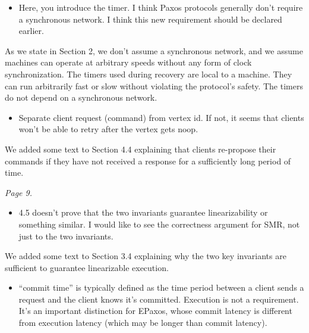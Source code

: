 \documentclass[letterpaper,twocolumn,10pt]{article}
\newenvironment{reviewerquote}
{\list{}{\leftmargin=\parindent\rightmargin=0in}\item[] \itshape \color{ReviewerDarkGray}}%
{\endlist}
\begin{document}
\begin{reviewerquote}
  \begin{itemize}
    \item
      Here, you introduce the timer. I think Paxos protocols generally don't
      require a synchronous network. I think this new requirement should be
      declared earlier.
  \end{itemize}
\end{reviewerquote}

As we state in Section 2, we don't assume a synchronous network, and we assume
machines can operate at arbitrary speeds without any form of clock
synchronization. The timers used during recovery are local to a machine. They
can run arbitrarily fast or slow without violating the protocol's safety. The
timers do not depend on a synchronous network.

\begin{reviewerquote}
  \begin{itemize}
    \item
      Separate client request (command) from vertex id. If not, it seems that
      clients won't be able to retry after the vertex gets noop.
  \end{itemize}
\end{reviewerquote}

We added some text to Section 4.4 explaining that clients re-propose their
commands if they have not received a response for a sufficiently long period of
time.

\begin{reviewerquote}
  Page 9.

  \begin{itemize}
    \item
      4.5 doesn't prove that the two invariants guarantee linearizability or
      something similar. I would like to see the correctness argument for SMR,
      not just to the two invariants.
  \end{itemize}
\end{reviewerquote}

We added some text to Section 3.4 explaining why the two key invariants are
sufficient to guarantee linearizable execution.

\begin{reviewerquote}
  \begin{itemize}
    \item
      ``commit time'' is typically defined as the time period between a client
      sends a request and the client knows it's committed. Execution is not a
      requirement. It's an important distinction for EPaxos, whose commit
      latency is different from execution latency (which may be longer than
      commit latency).
  \end{itemize}
\end{reviewerquote}
\end{document}
